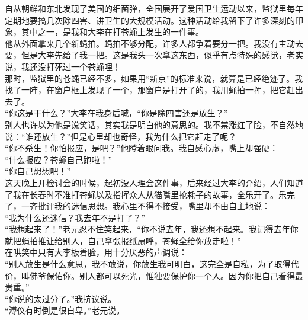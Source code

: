 自从朝鲜和东北发现了美国的细菌弹，全国展开了爱国卫生运动以来，监狱里每年定期地要搞几次除四害、讲卫生的大规模活动。这种活动给我留下了许多深刻的印象，其中之一，是我和大李在打苍蝇上发生的一件事。\\

他从外面拿来几个新蝇拍。蝇拍不够分配，许多人都争着要分一把。我没有主动去要，但是大李先给了我一把。这是我头一次拿这东西，似乎有点特殊的感觉，老实说，我还没打死过一个苍蝇哩！\\

那时，监狱里的苍蝇已经不多，如果用“新京”的标准来说，就算是已经绝迹了。我找了一阵，在窗户框上发现了一个，那窗户是打开了的，我用蝇拍一挥，把它赶出去了。\\

“你这是干什么？”大李在我身后喊，“你是除四害还是放生？”\\

别人也许以为他是说笑话，其实我是明白他的意思的。我不禁涨红了脸，不自然地说：“谁还放生？”但是心里却也奇怪，我为什么把它赶走了呢？\\

“你不杀生！你怕报应，是吧？”他瞪着眼问我。我自感心虚，嘴上却强硬：\\

“什么报应？苍蝇自己跑啦！”\\

“你自己想想吧！”\\

这天晚上开检讨会的时候，起初没人理会这件事，后来经过大李的介绍，人们知道了我在长春时不准打苍蝇以及指挥众人从猫嘴里抢耗子的故事，全乐开了。乐完了，一齐批评我的迷信思想。我心里不得不接受，嘴里却不由自主地说：\\

“我为什么还迷信？我去年不是打了？”\\

“我想起来了！”老元忍不住笑起来，“你不说去年，我还想不起来。我记得去年你就把蝇拍推让给别人，自己拿张报纸扇呼，苍蝇全给你放走啦！”\\

在哄笑中只有大李板着脸，用十分厌恶的声调说：\\

“别人放生是什么意思，我不敢说，你放生我可明白，这完全是自私，为了取得代价，叫佛爷保佑你。别人都可以死光，惟独要保护你一个人。因为你把自己看得最贵重。”\\

“你说的太过分了。”我抗议说。\\

“溥仪有时倒是很自卑。”老元说。\\

